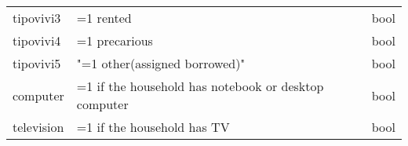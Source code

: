 \documentclass[11pt]{article}
\begin{document}
\begin{longtable}[]{@{}lll@{}}
\begin{minipage}[t]{0.19\columnwidth}\raggedright\strut
tipovivi3\strut
\end{minipage} & \begin{minipage}[t]{0.16\columnwidth}\raggedright\strut
=1 rented\strut
\end{minipage} & \begin{minipage}[t]{0.24\columnwidth}\raggedright\strut
bool\strut
\end{minipage}\tabularnewline
\begin{minipage}[t]{0.19\columnwidth}\raggedright\strut
tipovivi4\strut
\end{minipage} & \begin{minipage}[t]{0.16\columnwidth}\raggedright\strut
=1 precarious\strut
\end{minipage} & \begin{minipage}[t]{0.24\columnwidth}\raggedright\strut
bool\strut
\end{minipage}\tabularnewline
\begin{minipage}[t]{0.19\columnwidth}\raggedright\strut
tipovivi5\strut
\end{minipage} & \begin{minipage}[t]{0.16\columnwidth}\raggedright\strut
"=1 other(assigned borrowed)"\strut
\end{minipage} & \begin{minipage}[t]{0.24\columnwidth}\raggedright\strut
bool\strut
\end{minipage}\tabularnewline
\begin{minipage}[t]{0.19\columnwidth}\raggedright\strut
computer\strut
\end{minipage} & \begin{minipage}[t]{0.16\columnwidth}\raggedright\strut
=1 if the household has notebook or desktop computer\strut
\end{minipage} & \begin{minipage}[t]{0.24\columnwidth}\raggedright\strut
bool\strut
\end{minipage}\tabularnewline
\begin{minipage}[t]{0.19\columnwidth}\raggedright\strut
television\strut
\end{minipage} & \begin{minipage}[t]{0.16\columnwidth}\raggedright\strut
=1 if the household has TV\strut
\end{minipage} & \begin{minipage}[t]{0.24\columnwidth}\raggedright\strut
bool\strut
\end{minipage}\tabularnewline

\end{longtable}
\end{document}
